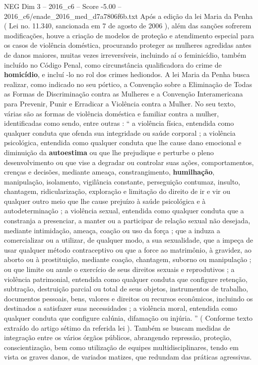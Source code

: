 \begin{textsample}{NEG Dim 3 – 2016\_c6 – Score -5.00 – 2016\_c6/enade\_2016\_med\_d7a7806f6b.txt}
Após a edição da lei Maria da Penha ( Lei no. 11.340, sancionada em 7 de agosto de 2006 ), além das sanções sofrerem modificações, houve a criação de modelos de proteção e atendimento especial para os casos de violência doméstica, procurando proteger as mulheres agredidas antes de danos maiores, muitas vezes irreversíveis, incluindo aí o feminicídio, também incluído no Código Penal, como circunstância qualificadora do crime de \textbf{homicídio}, e incluí -lo no rol dos crimes hediondos.
A lei Maria da Penha busca realizar, como indicado no seu pórtico, a Convenção sobre a Eliminação de Todas as Formas de Discriminação contra as Mulheres e a Convenção Interamericana para Prevenir, Punir e Erradicar a Violência contra a Mulher.
No seu texto, várias são as formas de violência doméstica e familiar contra a mulher, identificadas como sendo, entre outras : “ a violência física, entendida como qualquer conduta que ofenda sua integridade ou saúde corporal ; a violência psicológica, entendida como qualquer conduta que lhe cause dano emocional e diminuição da \textbf{autoestima} ou que lhe prejudique e perturbe o pleno desenvolvimento ou que vise a degradar ou controlar suas ações, comportamentos, crenças e decisões, mediante ameaça, constrangimento, \textbf{humilhação}, manipulação, isolamento, vigilância constante, perseguição contumaz, insulto, chantagem, ridicularização, exploração e limitação do direito de ir e vir ou qualquer outro meio que lhe cause prejuízo à saúde psicológica e à autodeterminação ; a violência sexual, entendida como qualquer conduta que a constranja a presenciar, a manter ou a participar de relação sexual não desejada, mediante intimidação, ameaça, coação ou uso da força ; que a induza a comercializar ou a utilizar, de qualquer modo, a sua sexualidade, que a impeça de usar qualquer método contraceptivo ou que a force ao matrimônio, à gravidez, ao aborto ou à prostituição, mediante coação, chantagem, suborno ou manipulação ; ou que limite ou anule o exercício de seus direitos sexuais e reprodutivos ; a violência patrimonial, entendida como qualquer conduta que configure retenção, subtração, destruição parcial ou total de seus objetos, instrumentos de trabalho, documentos pessoais, bens, valores e direitos ou recursos econômicos, incluindo os destinados a satisfazer suas necessidades ; a violência moral, entendida como qualquer conduta que configure calúnia, difamação ou injúria. ” ( Conforme texto extraído do artigo sétimo da referida lei ).
Também se buscam medidas de integração entre os vários órgãos públicos, abrangendo repressão, proteção, conscientização, bem como utilização de equipes multidisciplinares, tendo em vista os graves danos, de variados matizes, que redundam das práticas agressivas.

\end{textsample}
